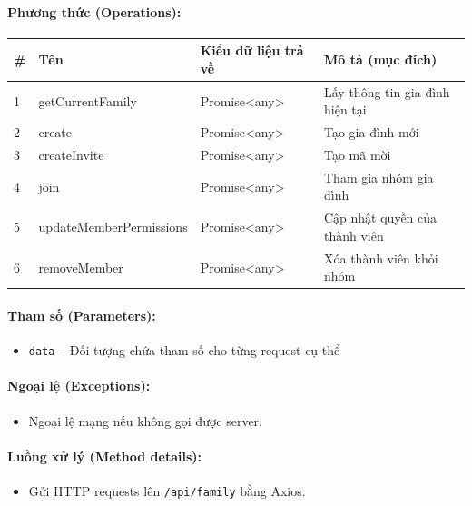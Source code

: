 \documentclass[12pt,a4paper]{article}
\begin{document}
\paragraph{Phương thức (Operations):}
\begin{longtable}{|p{0.6cm}|p{5.0cm}|p{2.8cm}|p{5.4cm}|}
\hline
\textbf{\#} & \textbf{Tên} & \textbf{Kiểu dữ liệu trả về} & \textbf{Mô tả (mục đích)} \\ \hline
\endhead
1 & getCurrentFamily & Promise\textless{}any\textgreater{} & Lấy thông tin gia đình hiện tại \\ \hline
2 & create & Promise\textless{}any\textgreater{} & Tạo gia đình mới \\ \hline
3 & createInvite & Promise\textless{}any\textgreater{} & Tạo mã mời \\ \hline
4 & join & Promise\textless{}any\textgreater{} & Tham gia nhóm gia đình \\ \hline
5 & updateMemberPermissions & Promise\textless{}any\textgreater{} & Cập nhật quyền của thành viên \\ \hline
6 & removeMember & Promise\textless{}any\textgreater{} & Xóa thành viên khỏi nhóm \\ \hline
\end{longtable}

\paragraph{Tham số (Parameters):}
\begin{itemize}[leftmargin=*]
    \item \texttt{data} – Đối tượng chứa tham số cho từng request cụ thể
\end{itemize}


\paragraph{Ngoại lệ (Exceptions):}
\begin{itemize}[leftmargin=*]
    \item Ngoại lệ mạng nếu không gọi được server.
\end{itemize}


\paragraph{Luồng xử lý (Method details):}
\begin{itemize}[leftmargin=*]
    \item Gửi HTTP requests lên \texttt{/api/family} bằng Axios.
\end{itemize}
\end{document}
